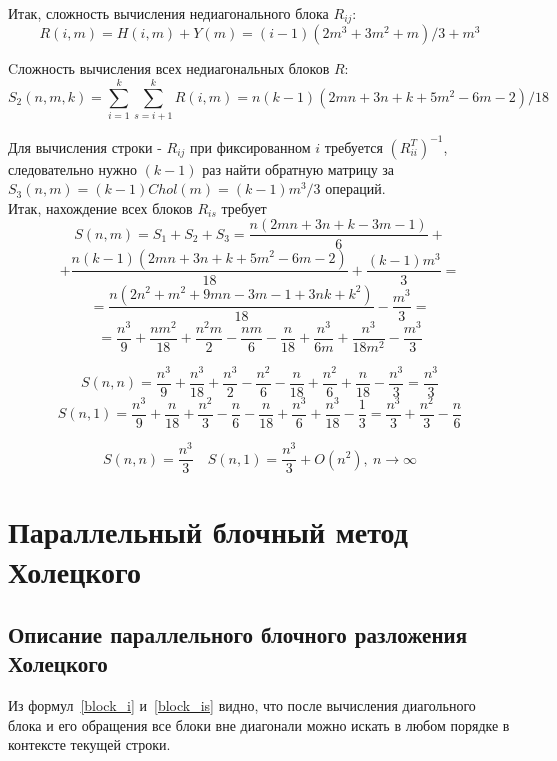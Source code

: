 \documentclass[a4paper,12pt]{article}
\begin{document}
    Итак, сложность вычисления недиагонального блока $R_{ij}$:
    $$ 
        R(i,m) = H(i,m) + Y(m) =
        (i-1)(2m^3+3m^2+m)/3 + m^3
    $$
    
    Cложность вычисления всех недиагональных блоков $R$:
    $$ 
        S_2(n,m,k) = 
        \sum_{i=1}^k\sum_{s=i+1}^k R(i,m) =
        n(k-1)(2mn+3n+k+5m^2-6m-2)/18
    $$
    
    Для вычисления строки - $R_{ij}$ при фиксированном $i$ требуется $(R_{ii}^T)^{-1}$,
    следовательно нужно $(k-1)$ раз найти обратную матрицу за \\
    $S_3(n, m) = (k-1)Chol(m) = (k-1)m^3/3$ операций. \\
    
    Итак, нахождение всех блоков $R_{is}$ требует
    $$
        S(n, m)= S_1 + S_2 + S_3 = 
        \frac{n(2mn + 3n + k - 3m -1)}6 + $$$$ +
        \frac{n(k-1)(2mn+3n+k+5m^2-6m-2)}{18} +
        \frac{(k-1)m^3}3 = $$$$ =
        \frac{n(2n^2+m^2+9mn-3m-1+3nk+k^2)}{18} - \frac{m^3}3 = $$$$ =
        \boxed {
            \frac{n^3}9 + \frac{nm^2}{18} + \frac{n^2m}2 - \frac{nm}6 -
            \frac{n}{18} + \frac{n^3}{6m} + \frac{n^3}{18m^2} - \frac{m^3}3  }
    $$
    
    $$ 
        S(n,n) =
        \frac{n^3}9 + \frac{n^3}{18} + \frac{n^3}2 - \frac{n^2}6 - 
        \frac{n}{18} + \frac{n^2}6 + \frac{n}{18} - \frac{n^3}3 = 
        \frac{n^3}3
    $$
    $$
        S(n,1) = 
        \frac{n^3}9 + \frac{n}{18} + \frac{n^2}3 - \frac{n}6 -
        \frac{n}{18} + \frac{n^3}6 + \frac{n^3}{18} - \frac{1}3 =
        \frac{n^3}3 + \frac{n^2}3 - \frac{n}6
    $$
    
    $$
        \boxed {
            S(n,n) = \frac{n^3}3 \quad 
            S(n,1) = \frac{n^3}3 + O(n^2),\ n \to \infty   }
    $$
    
    


\newpage
\section{Параллельный блочный метод Холецкого}
\subsection{Описание параллельного блочного разложения Холецкого}
    Из формул~\eqref{block_i} и~\eqref{block_is} видно, что после вычисления диагольного 
    блока и его обращения все блоки вне диагонали можно искать в любом порядке в 
    контексте текущей строки. \\
    
\end{document}
